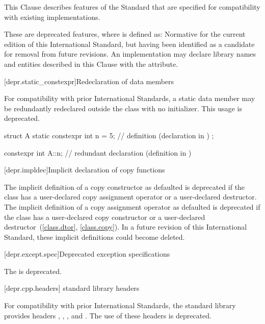 
\pnum
This Clause describes features of the \Cpp{} Standard that are specified for compatibility with
existing implementations.

\pnum
These are deprecated features, where
is defined as:
Normative for the current edition of this International Standard,
but having been identified as a candidate for removal from future revisions.
An implementation may declare library names and entities described in this Clause with the
 attribute.

[depr.static_constexpr]{Redeclaration of  data members}

\pnum
For compatibility with prior \Cpp{} International Standards, a 
static data member may be redundantly redeclared outside the class with no initializer.
This usage is deprecated.
\begin{example}
\begin{codeblock}
struct A {
  static constexpr int n = 5;  // definition (declaration in \CppXIV{})
};

constexpr int A::n;  // redundant declaration (definition in \CppXIV{})
\end{codeblock}
\end{example}

[depr.impldec]{Implicit declaration of copy functions}

\pnum
The implicit definition of a copy constructor
as defaulted
is deprecated if the class has a
user-declared copy assignment operator or a user-declared destructor. The implicit
definition of a copy assignment operator
as defaulted is deprecated if the class has a user-declared
copy constructor or a user-declared destructor~(\ref{class.dtor}, \ref{class.copy}).
In a future revision of this International Standard, these implicit definitions
could become deleted.

[depr.except.spec]{Deprecated exception specifications}

\pnum
The   is deprecated.

[depr.cpp.headers]{\Cpp{} standard library headers}

\pnum
For compatibility with prior \Cpp{} International Standards,
the \Cpp{} standard library provides headers
,
,
,
and .
The use of these headers is deprecated.

